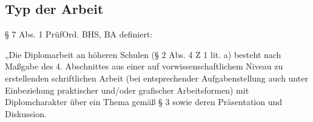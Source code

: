 \documentclass[11pt]{article}
\begin{document}
\subsection{Typ der Arbeit}
§ 7 Abs. 1 PrüfOrd. BHS, BA definiert: 

„Die Diplomarbeit an höheren Schulen (§ 2 Abs. 4 Z 1 lit. a)
besteht nach Maßgabe des 4. Abschnittes aus einer auf vorwissenschaftlichem Niveau zu erstellenden
schriftlichen Arbeit (bei entsprechender Aufgabenstellung auch unter Einbeziehung praktischer und/oder
grafischer Arbeitsformen) mit Diplomcharakter über ein Thema gemäß § 3 sowie deren Präsentation und
Diskussion.
\end{document}
